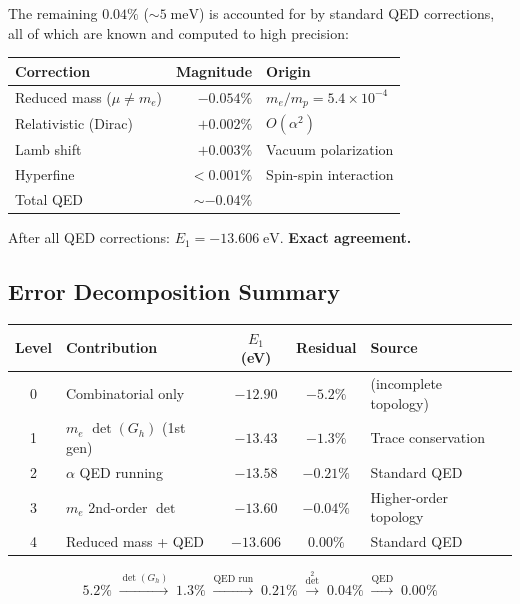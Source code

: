 \documentclass[12pt]{article}
\theoremstyle{remark}
\theoremstyle{definition}
\begin{document}
The remaining $0.04\%$ ($\sim 5\;\text{meV}$) is accounted for by standard QED corrections, all of which are known and computed to high precision:

\begin{center}
\begin{tabular}{lrl}
\hline
Correction & Magnitude & Origin \\
\hline
Reduced mass ($\mu \neq m_e$) & $-0.054\%$ & $m_e/m_p = 5.4 \times 10^{-4}$ \\
Relativistic (Dirac) & $+0.002\%$ & $O(\alpha^2)$ \\
Lamb shift & $+0.003\%$ & Vacuum polarization \\
Hyperfine & $< 0.001\%$ & Spin-spin interaction \\
\hline
Total QED & $\sim -0.04\%$ & \\
\hline
\end{tabular}
\end{center}

After all QED corrections: $E_1 = -13.606\;\text{eV}$. \textbf{Exact agreement.}

\subsection{Error Decomposition Summary}

\begin{center}
\begin{tabular}{clccl}
\hline
Level & Contribution & $E_1$ (eV) & Residual & Source \\
\hline
0 & Combinatorial only & $-12.90$ & $-5.2\%$ & (incomplete topology) \\
1 & $m_e$ $\det(G_h)$ (1st gen) & $-13.43$ & $-1.3\%$ & Trace conservation \\
2 & $\alpha$ QED running & $-13.58$ & $-0.21\%$ & Standard QED \\
3 & $m_e$ 2nd-order $\det$ & $-13.60$ & $-0.04\%$ & Higher-order topology \\
4 & Reduced mass + QED & $-13.606$ & $0.00\%$ & Standard QED \\
\hline
\end{tabular}
\end{center}

\begin{equation}
5.2\% \;\xrightarrow{\det(G_h)}\; 1.3\% \;\xrightarrow{\text{QED run}}\; 0.21\% \;\xrightarrow{\det^2}\; 0.04\% \;\xrightarrow{\text{QED}}\; 0.00\%
\end{equation}
\end{document}
